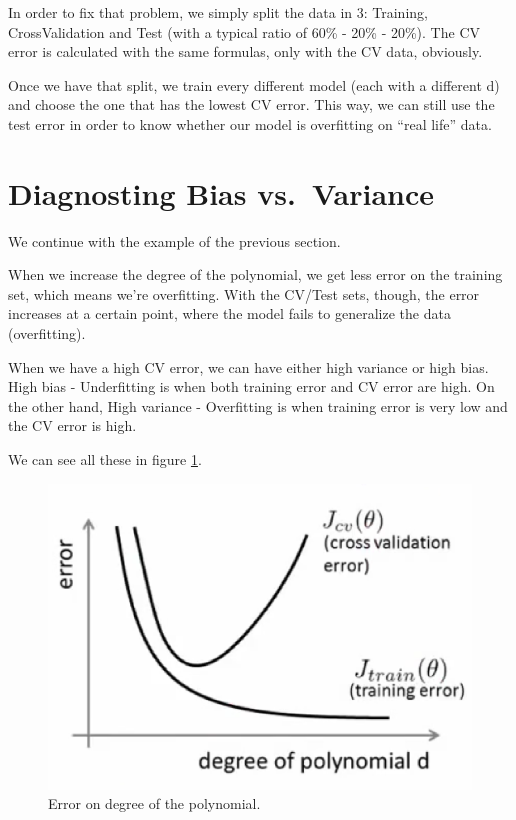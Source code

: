 \documentclass[10pt]{extarticle}
\begin{document}
In order to fix that problem, we simply split the data in 3: Training,
CrossValidation and Test (with a typical ratio of 60\% - 20\% - 20\%).
The CV error is calculated with the same formulas, only with the CV
data, obviously.

Once we have that split, we train every different model (each with a
different d) and choose the one that has the lowest CV error. This way,
we can still use the test error in order to know whether our model is
overfitting on ``real life'' data.

\section{Diagnosting Bias
vs.~Variance}\label{diagnosting-bias-vs.variance}

We continue with the example of the previous section.

When we increase the degree of the polynomial, we get less error on the
training set, which means we're overfitting. With the CV/Test sets,
though, the error increases at a certain point, where the model fails to
generalize the data (overfitting).

When we have a high CV error, we can have either high variance or high
bias. High bias - Underfitting is when both training error and CV error
are high. On the other hand, High variance - Overfitting is when
training error is very low and the CV error is high.

We can see all these in figure \ref{fig:error_degree_polynomial}.

\begin{figure}
\centering
\includegraphics[width=\textwidth]{img/error_degree_polynomial.eps}
\caption{Error on degree of the polynomial.}
\label{fig:error_degree_polynomial}
\end{figure}
\end{document}
